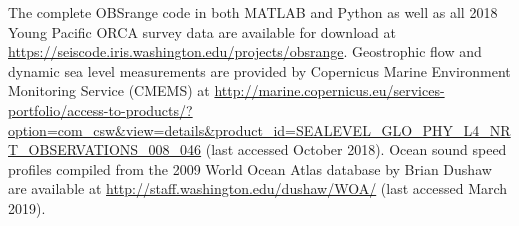 The complete OBSrange code in both MATLAB and Python as well as all 2018 Young Pacific ORCA survey data are available for download at \href{https://seiscode.iris.washington.edu/projects/obsrange}{https://seiscode.iris.washington.edu/projects/obsrange}. Geostrophic flow and dynamic sea level measurements are provided by Copernicus
Marine Environment Monitoring Service (CMEMS) at \href{http://marine.copernicus.eu/services-portfolio/access-to-products/?option=com_csw\&view=details\&product_id=SEALEVEL_GLO_PHY_L4_NRT_OBSERVATIONS_008_046}{http://marine.copernicus.eu/services-portfolio/access-to-products/?option=com\_csw\&view=details\&product\_id=SEALEVEL\_GLO\_PHY\_L4\_NRT\_OBSERVATIONS\_008\_046} (last accessed October 2018). Ocean sound speed profiles compiled from the 2009 World Ocean Atlas database by Brian Dushaw are available at \href{http://staff.washington.edu/dushaw/WOA/}{http://staff.washington.edu/dushaw/WOA/} (last accessed March 2019).